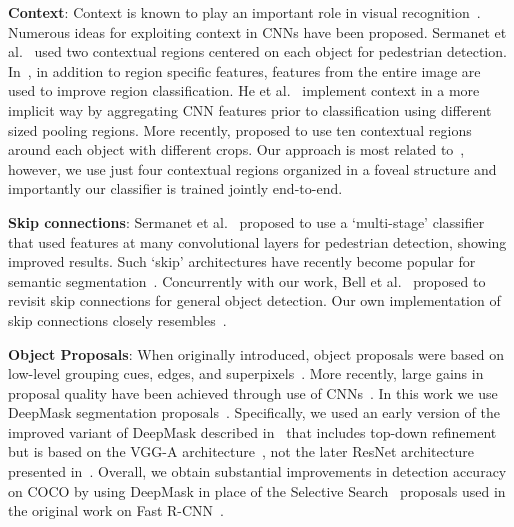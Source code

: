 \documentclass{bmvc2k}
\begin{document}
\textbf{Context}: Context is known to play an important role in visual recognition~\cite{torralba2003contextual}. Numerous ideas for exploiting context in CNNs have been proposed. Sermanet et al.~\cite{sermanetCVPR2013} used two contextual regions centered on each object for pedestrian detection. In~\cite{Szegedy15}, in addition to region specific features, features from the entire image are used to improve region classification. He et al.~\cite{He2014sppNet} implement context in a more implicit way by aggregating CNN features prior to classification using different sized pooling regions. More recently, \cite{gidaris2015object} proposed to use ten contextual regions around each object with different crops. Our approach is most related to~\cite{gidaris2015object}, however, we use just four contextual regions organized in a foveal structure and importantly our classifier is trained jointly end-to-end.

\textbf{Skip connections}: Sermanet et al.~\cite{sermanetCVPR2013} proposed to use a `multi-stage' classifier that used features at many convolutional layers for pedestrian detection, showing improved results. Such `skip' architectures have recently become popular for semantic segmentation~\cite{longCVPR15fcn, BharathCVPR2015}. Concurrently with our work, Bell et al.~\cite{bell15ion} proposed to revisit skip connections for general object detection. Our own implementation of skip connections closely resembles~\cite{bell15ion}.

\textbf{Object Proposals}: When originally introduced, object proposals were based on low-level grouping cues, edges, and superpixels~\cite{AlexePAMI12, Uijlings13, ZitnickD14, CVPR2015MCG, Hosang2015proposals}. More recently, large gains in proposal quality have been achieved through use of CNNs~\cite{Szegedy15, RenNIPS15fasterRCNN, pinheiro2015learning, pinheiro2016refining}. In this work we use DeepMask segmentation proposals~\cite{pinheiro2015learning}. Specifically, we used an early version of the improved variant of DeepMask described in~\cite{pinheiro2016refining} that includes top-down refinement but is based on the VGG-A architecture~\cite{Simonyan15}, not the later ResNet architecture presented in~\cite{he2015deep}. Overall, we obtain substantial improvements in detection accuracy on COCO by using DeepMask in place of the Selective Search~\cite{Uijlings13} proposals used in the original work on Fast R-CNN~\cite{girshick15fastrcnn}.
\end{document}
